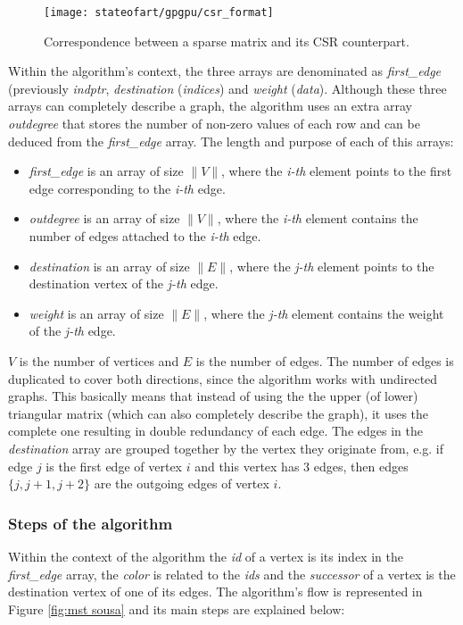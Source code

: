 \begin{figure}[hbtp]
\centering
\texttt{[image: stateofart/gpgpu/csr\_format]}
\caption{Correspondence between a sparse matrix and its CSR counterpart.}
\label{fig:csr}
\end{figure}

Within the algorithm's context, the three arrays are denominated as \emph{first\_edge} (previously \emph{indptr}, \emph{destination} (\emph{indices}) and \emph{weight} (\emph{data}). Although these three arrays can completely describe a graph, the algorithm uses an extra array \emph{outdegree} that stores the number of non-zero values of each row and can be deduced from the \emph{first\_edge} array.
The length and purpose of each of this arrays:
\begin{itemize}
	\item \emph{first\_edge} is an array of size $\|V\|$, where the \emph{i-th} element points to the first edge corresponding to the \emph{i-th} edge.
	\item \emph{outdegree} is an array of size $\|V\|$, where the \emph{i-th} element contains the number of edges attached to the \emph{i-th} edge.
	\item \emph{destination} is an array of size $\|E\|$, where the \emph{j-th} element points to the destination vertex of the \emph{j-th} edge.
	\item \emph{weight} is an array of size $\|E\|$, where the \emph{j-th} element contains the weight of the \emph{j-th} edge.
\end{itemize}

$V$ is the number of vertices and $E$ is the number of edges.
The number of edges is duplicated to cover both directions, since the algorithm works with undirected graphs.
This basically means that instead of using the the upper (of lower) triangular matrix (which can also completely describe the graph), it uses the complete one resulting in double redundancy of each edge.
The edges in the \emph{destination} array are grouped together by the vertex they originate from, e.g. if edge $j$ is the first edge of vertex $i$ and this vertex has 3 edges, then edges $\{j,j+1,j+2\}$ are the outgoing edges of vertex $i$.

\subsubsection{Steps of the algorithm}

Within the context of the algorithm the \emph{id} of a vertex is its index in the \emph{first\_edge} array, the \emph{color} is related to the \emph{ids} and the \emph{successor} of a vertex is the destination vertex of one of its edges. The algorithm's flow is represented in Figure \ref{fig:mst sousa} and its main steps are explained below:

